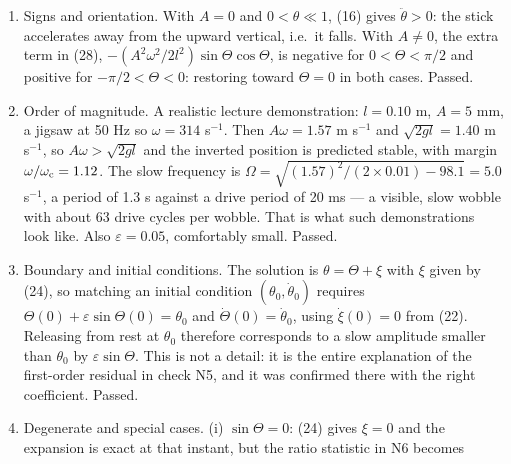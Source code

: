 \documentclass[11pt,a4paper]{article}
\begin{document}
\begin{enumerate}
  vertical plane, and \(W\) in (29) is even in \(\Theta\). Accordingly \(\Theta_{\rm c}\)
  comes in a \(\pm\) pair, as figure 3 shows. (16) is invariant under \(t\to-t\),
  since \(\cos\omega t\) is even, and the averaged system (28) is conservative,
  consistent with that. Third and most informative: shifting \(t\) by half a drive
  period sends \(\cos\omega t\to-\cos\omega t\), which is the same as \(A\to-A\). The
  dynamics cannot depend on the arbitrary choice of time origin, so every
  time-averaged result must be even in \(A\). Both (37) and (41) depend on \(A\) only
  through \(A^2\). Passed --- and this one has teeth, because an error of the form
  ``\(\Omega^2 \propto A\omega^2/l\)'' would violate it.
\item
  Signs and orientation. With \(A=0\) and \(0<\theta\ll1\), (16) gives
  \(\ddot\theta>0\): the stick accelerates away from the upward vertical, i.e.~it
  falls. With \(A\ne0\), the extra term in (28),
  \(-(A^2\omega^2/2l^2)\sin\Theta\cos\Theta\), is negative for \(0<\Theta<\pi/2\) and
  positive for \(-\pi/2<\Theta<0\): restoring toward \(\Theta=0\) in both cases.
  Passed.
\item
  Order of magnitude. A realistic lecture demonstration: \(l=0.10\) m,
  \(A=5\) mm, a jigsaw at 50 Hz so \(\omega=314\) s\(^{-1}\). Then \(A\omega=1.57\)
  m s\(^{-1}\) and \(\sqrt{2gl}=1.40\) m s\(^{-1}\), so \(A\omega>\sqrt{2gl}\) and the
  inverted position is predicted stable, with margin
  \(\omega/\omega_{\rm c}=1.12\). The slow frequency is
  \(\Omega=\sqrt{(1.57)^2/(2\times0.01)-98.1}=5.0\) s\(^{-1}\), a period of 1.3 s
  against a drive period of 20 ms --- a visible, slow wobble with about 63 drive
  cycles per wobble. That is what such demonstrations look like. Also
  \(\varepsilon=0.05\), comfortably small. Passed.
\item
  Boundary and initial conditions. The solution is \(\theta=\Theta+\xi\) with
  \(\xi\) given by (24), so matching an initial condition \((\theta_0,\dot\theta_0)\)
  requires \(\Theta(0)+\varepsilon\sin\Theta(0)=\theta_0\) and
  \(\dot\Theta(0)=\dot\theta_0\), using \(\dot\xi(0)=0\) from (22). Releasing from
  rest at \(\theta_0\) therefore corresponds to a slow amplitude smaller than
  \(\theta_0\) by \(\varepsilon\sin\Theta\). This is not a detail: it is the entire
  explanation of the first-order residual in check N5, and it was confirmed there
  with the right coefficient. Passed.
\item
  Degenerate and special cases. (i) \(\sin\Theta=0\): (24) gives \(\xi=0\) and
  the expansion is exact at that instant, but the ratio statistic in N6 becomes

\end{enumerate}
\end{document}
